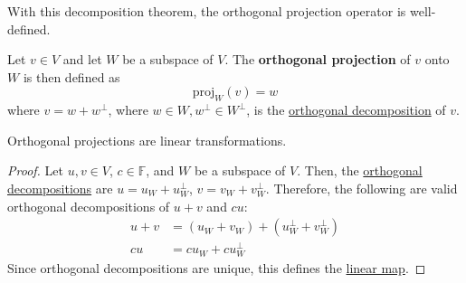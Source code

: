 	With this decomposition theorem, the orthogonal projection operator is well-defined. 

  \begin{definition}
    \label{def:orthogonal-projection}
    Let $v \in V$ and let $W$ be a subspace of $V$. The \textbf{orthogonal projection} of $v$ onto $W$ is then defined as 
    \begin{equation}
      \text{proj}_W (v) = w
    \end{equation}
		where $v = w + w^\perp$, where $w \in W, w^\perp \in W^\perp$, is the \hyperref[thm:orthogonal-decomposition-theorem]{orthogonal decomposition} of $v$. 
  \end{definition}

	\begin{lemma}
	  \label{thm:orthogonal-projections-are-linear}
    Orthogonal projections are linear transformations. 
	\end{lemma}
	\begin{proof}
		Let $u, v \in V$, $c \in \mathbb{F}$, and $W$ be a subspace of $V$. Then, the \hyperref[thm:orthogonal-decomposition-theorem]{orthogonal decompositions} are $u = u_W + u_W^\perp$, $v = v_W + v_W^\perp$. Therefore, the following are valid orthogonal decompositions of $u + v$ and $cu$: 
		\begin{align}
			u + v & = (u_W + v_W) + (u_W^\perp + v_W^\perp) \\
			c u & = cu_W + cu_W^\perp 
		\end{align}
		Since orthogonal decompositions are unique, this defines the \hyperref[def:linear_map]{linear map}. 
	\end{proof}

